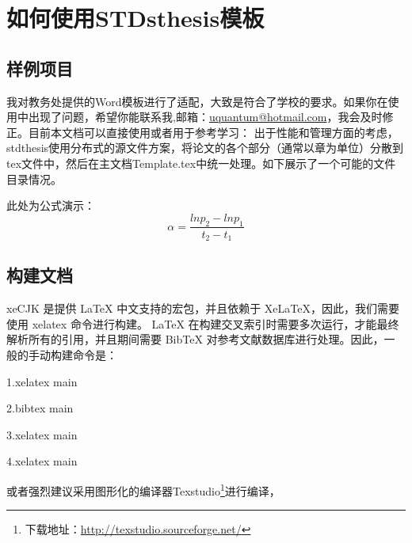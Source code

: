
\chapter{如何使用STDsthesis模板}
\section{样例项目}
我对教务处提供的Word模板进行了适配，大致是符合了学校的要求。如果你在使用中出现了问题，希望你能联系我,邮箱：\href{uquantum@hotmail.com}{uquantum@hotmail.com}，我会及时修正。目前本文档可以直接使用或者用于参考学习：
出于性能和管理方面的考虑，stdthesis使用分布式的源文件方案，将论文的各个部分（通常以章为单位）分散到tex文件中，然后在主文档Template.tex中统一处理。如下展示了一个可能的文件目录情况。

此处为公式演示：
\begin{equation}
\alpha=\dfrac{lnp_2-lnp_1}{t_2-t_1}\label{eq:zuning}
\end{equation}
\section{构建文档}
xeCJK 是提供 LaTeX 中文支持的宏包，并且依赖于 XeLaTeX，因此，我们需要使用 xelatex 命令进行构建。
LaTeX 在构建交叉索引时需要多次运行，才能最终解析所有的引用，并且期间需要 BibTeX 对参考文献数据库进行处理。因此，一般的手动构建命令是：

1.xelatex main

2.bibtex main

3.xelatex main

4.xelatex main

或者强烈建议采用图形化的编译器Texstudio\footnote{下载地址：\href{http://texstudio.sourceforge.net/}{http://texstudio.sourceforge.net/}}进行编译，
